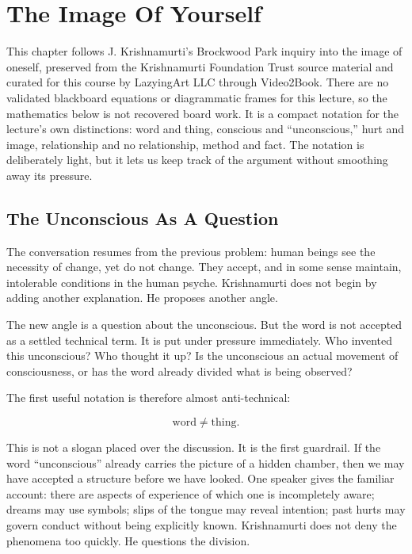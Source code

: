\chapter{The Image Of Yourself}

This chapter follows J. Krishnamurti's Brockwood Park inquiry into the image of oneself, preserved from the Krishnamurti Foundation Trust source material and curated for this course by LazyingArt LLC through Video2Book. There are no validated blackboard equations or diagrammatic frames for this lecture, so the mathematics below is not recovered board work. It is a compact notation for the lecture's own distinctions: word and thing, conscious and ``unconscious,'' hurt and image, relationship and no relationship, method and fact. The notation is deliberately light, but it lets us keep track of the argument without smoothing away its pressure.

\section{The Unconscious As A Question}

The conversation resumes from the previous problem: human beings see the necessity of change, yet do not change. They accept, and in some sense maintain, intolerable conditions in the human psyche. Krishnamurti does not begin by adding another explanation. He proposes another angle.

The new angle is a question about the unconscious. But the word is not accepted as a settled technical term. It is put under pressure immediately. Who invented this unconscious? Who thought it up? Is the unconscious an actual movement of consciousness, or has the word already divided what is being observed?

The first useful notation is therefore almost anti-technical:

\begin{equation}
\text{word} \neq \text{thing}.
\end{equation}

This is not a slogan placed over the discussion. It is the first guardrail. If the word ``unconscious'' already carries the picture of a hidden chamber, then we may have accepted a structure before we have looked. One speaker gives the familiar account: there are aspects of experience of which one is incompletely aware; dreams may use symbols; slips of the tongue may reveal intention; past hurts may govern conduct without being explicitly known. Krishnamurti does not deny the phenomena too quickly. He questions the division.

